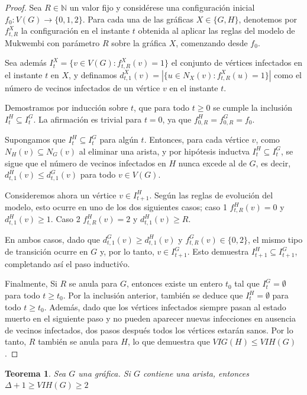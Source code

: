 \documentclass[12pt,titlepage,twoside,openright]{book}
\newtheorem{theorem}{Teorema}[section]
\begin{document}
\begin{proof}
    Sea $R\in\mathbb{N}$ un valor fijo y consid\'erese una configuraci\'on inicial $f_0:V(G)\to\{0,1,2\}$. Para cada una de las gr\'aficas $X\in\{G,H\}$, denotemos por $f^X_{t,R}$ la configuraci\'on en el instante $t$ obtenida al aplicar las reglas del modelo de Mukwembi con par\'ametro $R$ sobre la gr\'afica $X$, comenzando desde $f_0$.
    
    Sea adem\'as $I^X_t=\{v\in V(G): f^X_{t,R}(v)=1\}$ el conjunto de v\'ertices infectados en el instante $t$ en $X$, y definamos $d^X_{t,1}(v)=|\{u\in N_X(v): f^X_{t,R}(u)=1\}|$ como el n\'umero de vecinos infectados de un v\'ertice $v$ en el instante $t$.

    Demostramos por inducci\'on sobre $t$, que para todo $t\geq 0$ se cumple la inclusi\'on $I^H_t\subseteq I^G_t$. La afirmaci\'on es trivial para $t=0$, ya que $f^H_{0,R}=f^G_{0,R}=f_0$.
    
    Supongamos que $I^H_t\subseteq I^G_t$ para alg\'un $t$. Entonces, para cada v\'ertice $v$, como $N_H(v)\subseteq N_G(v)$ al eliminar una arista, y por hip\'otesis inductva $I^H_t\subseteq I^G_t$, se sigue que el n\'umero de vecinos infectados en $H$ nunca excede al de $G$, es decir, $d^H_{t,1}(v)\le d^G_{t,1}(v)$ para todo $v \in V(G)$.
    
    Consideremos ahora un v\'ertice $v\in I^H_{t+1}$. Seg\'un las reglas de evoluci\'on del modelo, esto ocurre en uno de los dos siguientes casos; caso 1 $f^H_{t,R}(v)=0$ y $d^H_{t,1}(v)\ge 1$. Caso 2 $f^H_{t,R}(v)=2$ y $d^H_{t,1}(v)\ge R$.
    
    En ambos casos, dado que $d^G_{t,1}(v)\ge d^H_{t,1}(v)$ y $f^G_{t,R}(v)\in\{0,2\}$, el mismo tipo de transici\'on ocurre en $G$ y, por lo tanto, $v\in I^G_{t+1}$. Esto demuestra $I^H_{t+1}\subseteq I^G_{t+1}$, completando as\'i el paso inducti\'vo. 

    Finalmente, Si $R$ se anula para $G$, entonces existe un entero $t_0$ tal que $I^G_t=\emptyset$ para todo $t\ge t_0$. Por la inclusi\'on anterior, tambi\'en se deduce que $I^H_t=\emptyset$ para todo $t\ge t_0$. Adem\'as, dado que los v\'ertices infectados siempre pasan al estado muerto en el siguiente paso y no pueden aparecer nuevas infecciones en ausencia de vecinos infectados, dos pasos despu\'es todos los v\'ertices estar\'an sanos. Por lo tanto, $R$ tambi\'en se anula para $H$, lo que demuestra que $VIG(H)\le VIH(G)$.
\end{proof}
\begin{theorem}\label{Teo:Delta+1}
    Sea $G$ una gr\'afica. Si $G$ contiene una arista, entonces $\Delta+1\geq VIH(G) \geq 2$ 
\end{theorem}
\end{document}
